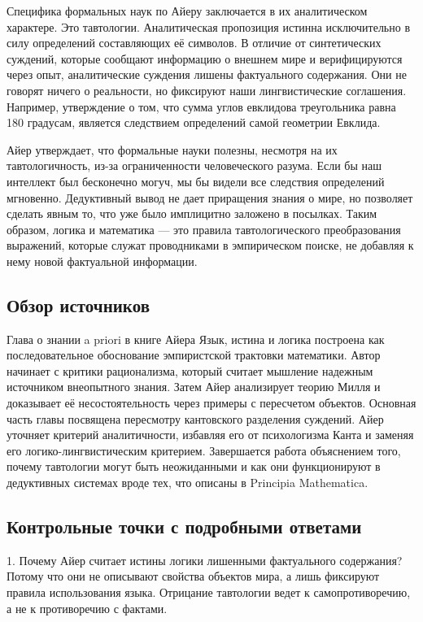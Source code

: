 \documentclass[a4paper,12pt]{article}
\begin{document}
Специфика формальных наук по Айеру заключается в их аналитическом характере. Это тавтологии. Аналитическая пропозиция истинна исключительно в силу определений составляющих её символов. В отличие от синтетических суждений, которые сообщают информацию о внешнем мире и верифицируются через опыт, аналитические суждения лишены фактуального содержания. Они не говорят ничего о реальности, но фиксируют наши лингвистические соглашения. Например, утверждение о том, что сумма углов евклидова треугольника равна 180 градусам, является следствием определений самой геометрии Евклида.

Айер утверждает, что формальные науки полезны, несмотря на их тавтологичность, из-за ограниченности человеческого разума. Если бы наш интеллект был бесконечно могуч, мы бы видели все следствия определений мгновенно. Дедуктивный вывод не дает приращения знания о мире, но позволяет сделать явным то, что уже было имплицитно заложено в посылках. Таким образом, логика и математика — это правила тавтологического преобразования выражений, которые служат проводниками в эмпирическом поиске, не добавляя к нему новой фактуальной информации.

\subsection{Обзор источников}

Глава о знании a priori в книге Айера Язык, истина и логика построена как последовательное обоснование эмпиристской трактовки математики. Автор начинает с критики рационализма, который считает мышление надежным источником внеопытного знания. Затем Айер анализирует теорию Милля и доказывает её несостоятельность через примеры с пересчетом объектов. Основная часть главы посвящена пересмотру кантовского разделения суждений. Айер уточняет критерий аналитичности, избавляя его от психологизма Канта и заменяя его логико-лингвистическим критерием. Завершается работа объяснением того, почему тавтологии могут быть неожиданными и как они функционируют в дедуктивных системах вроде тех, что описаны в Principia Mathematica.

\subsection{Контрольные точки с подробными ответами}

1. Почему Айер считает истины логики лишенными фактуального содержания?
Потому что они не описывают свойства объектов мира, а лишь фиксируют правила использования языка. Отрицание тавтологии ведет к самопротиворечию, а не к противоречию с фактами.
\end{document}
